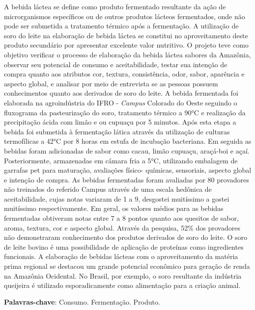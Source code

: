 \documentclass[article,12pt,onesidea,4paper,english,brazil]{abntex2}
\begin{document}
	\noindent A bebida láctea se define como produto fermentado resultante da ação de
	microrganismos específicos ou de outros produtos lácteos fermentados, onde não
	pode ser submetida a tratamento térmico após a fermentação. A utilização de soro
	do leite na elaboração de bebida láctea se constitui no aproveitamento deste produto
	secundário por apresentar excelente valor nutritivo. O projeto teve como objetivo
	verificar o processo de elaboração da bebida láctea sabores da Amazônia, observar
	seu potencial de consumo e aceitabilidade, testar sua intenção de compra quanto
	aos atributos cor, textura, consistência, odor, sabor, aparência e aspecto global, e
	analisar por meio de entrevista se as pessoas possuem conhecimentos quanto aos
	derivados de soro do leite. A bebida fermentada foi elaborada na agroindústria do
	IFRO - \textit{Campus} Colorado do Oeste seguindo o fluxograma da pasteurização do
	soro, tratamento térmico a 90°C e realização da precipitação ácida com limão e ou
	cupuaçu por 5 minutos. Após esta etapa a bebida foi submetida à fermentação lática
	através da utilização de culturas termofílicas a 42°C por 8 horas em estufa de
	incubação bacteriana. Em seguida as bebidas foram adicionadas de sabor como
	cacau, limão cupuaçu, araçá-boi e açaí. Posteriormente, armazenadas em câmara
	fria a 5°C, utilizando embalagem de garrafas pet para maturação, avaliações físico-
	químicas, sensoriais, aspecto global e intenção de compra. As bebidas fermentadas
	foram avaliadas por 80 provadores não treinados do referido Campus através de
	uma escala hedônica de aceitabilidade, cujas notas variaram de 1 a 9, desgostei
	muitíssimo a gostei muitíssimo respectivamente. Em geral, os valores médios para
	as bebidas fermentadas obtiveram notas entre 7 a 8 pontos quanto aos quesitos de
	sabor, aroma, textura, cor e aspecto global. Através da pesquisa, 52\% dos
	provadores não demonstraram conhecimento dos produtos derivados de soro do
	leite. O soro de leite bovino é uma possibilidade de aplicação de proteínas como
	ingredientes funcionais. A elaboração de bebidas lácteas com o aproveitamento da
	matéria prima regional se destacou um grande potencial econômico para geração de
	renda na Amazônia Ocidental. No Brasil, por exemplo, o soro resultante da indústria
	queijeira é utilizado esporadicamente como alimentação para a criação animal.
	
	\vspace{\onelineskip}
	
	\noindent
	\textbf{Palavras-chave}: Consumo. Fermentação. Produto.
	
\end{document}

